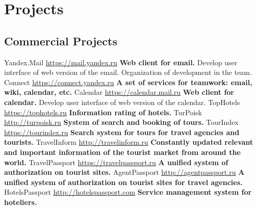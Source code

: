 \documentclass[11pt,a4paper]{moderncv}
\begin{document}
\maketitle
\section{Projects}
  \subsection{Commercial Projects}
  \cvline
    {Yandex.Mail}
    {\url{https://mail.yandex.ru}\newline{}
    \textbf{Web client for email.}\newline{}
    Develop user interface of web version of the email.\newline{}
    Organization of development in the team.}
  \cvline
    {Connect}
    {\url{https://connect.yandex.ru}\newline{}
    \textbf{A set of services for teamwork: email, wiki, calendar, etc.}\newline{}
    }
  \cvline
    {Calendar}
    {\url{https://calendar.mail.ru}\newline{}
    \textbf{Web client for calendar.}\newline{}
    Develop user interface of web version of the calendar.}
  \cvline
    {TopHotels}
    {\url{https://tophotels.ru}\newline{}
    \textbf{Information rating of hotels.}\newline{}
    }
  \cvline
    {TurPoisk}
    {\url{http://turpoisk.ru}\newline{}
    \textbf{System of search and booking of tours.}\newline{}
    }
  \cvline
    {TourIndex}
    {\url{https://tourindex.ru}\newline{}
    \textbf{Search system for tours for travel agencies and tourists.}\newline{}
    }
  \cvline
    {TravelInform}
    {\url{http://travelinform.ru}\newline{}
    \textbf{Constantly updated relevant and important information of the tourist market from around the world.}\newline{}
    }
  \cvline
    {TravelPassport}
    {\url{https://travelpassport.ru}\newline{}
    \textbf{A unified system of authorization on tourist sites.}\newline{}
    }
  \cvline
    {AgentPassport}
    {\url{http://agentpassport.ru}\newline{}
    \textbf{A unified system of authorization on tourist sites for travel agencies.}\newline{}
    }
  \cvline
    {HotelsPassport}
    {\url{http://hotelspassport.com}\newline{}
    \textbf{Service management system for hoteliers.}\newline{}
    }
\end{document}
